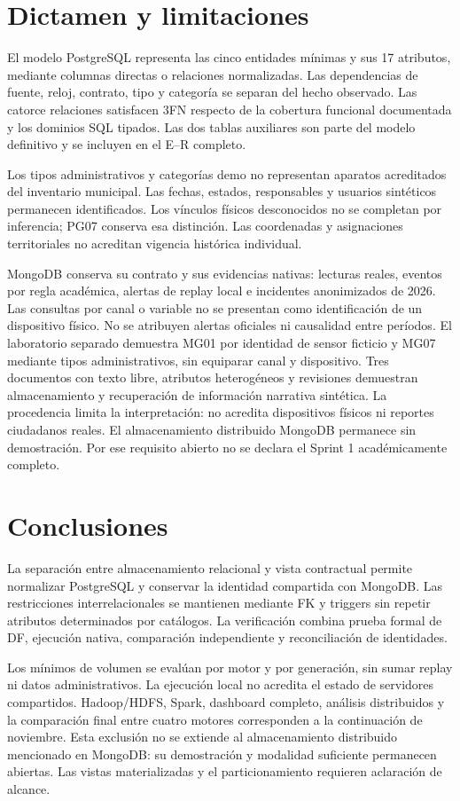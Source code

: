 \section{Dictamen y limitaciones}
El modelo PostgreSQL representa las cinco entidades mínimas y sus 17 atributos,
mediante columnas directas o relaciones normalizadas. Las dependencias de
fuente, reloj, contrato, tipo y categoría se separan del hecho observado.
Las catorce relaciones satisfacen 3FN respecto de la cobertura funcional
documentada y los dominios SQL tipados. Las dos tablas auxiliares son parte del
modelo definitivo y se incluyen en el E--R completo.

Los tipos administrativos y categorías demo no representan aparatos acreditados
del inventario municipal. Las fechas, estados, responsables y usuarios
sintéticos permanecen identificados. Los vínculos físicos desconocidos no se
completan por inferencia; PG07 conserva esa distinción. Las coordenadas y
asignaciones territoriales no acreditan vigencia histórica individual.

MongoDB conserva su contrato y sus evidencias nativas: lecturas reales, eventos
por regla académica, alertas de replay local e incidentes anonimizados de 2026.
Las consultas por canal o variable no se presentan como identificación de un
dispositivo físico. No se atribuyen alertas oficiales ni causalidad entre períodos.
El laboratorio separado demuestra MG01 por identidad de sensor ficticio y MG07
mediante tipos administrativos, sin equiparar canal y dispositivo. Tres documentos
con texto libre, atributos heterogéneos y revisiones demuestran almacenamiento y
recuperación de información narrativa sintética. La procedencia limita la
interpretación: no acredita dispositivos físicos ni reportes ciudadanos reales.
El almacenamiento distribuido MongoDB permanece sin demostración. Por ese
requisito abierto no se declara el Sprint 1 académicamente completo.

\section{Conclusiones}
La separación entre almacenamiento relacional y vista contractual permite
normalizar PostgreSQL y conservar la identidad compartida con MongoDB. Las
restricciones interrelacionales se mantienen mediante FK y triggers sin repetir
atributos determinados por catálogos. La verificación combina prueba formal de
DF, ejecución nativa, comparación independiente y reconciliación de identidades.

\begin{samepage}
Los mínimos de volumen se evalúan por motor y por generación, sin sumar replay
ni datos administrativos. La ejecución local no acredita el estado de servidores
compartidos. Hadoop/HDFS, Spark, dashboard completo, análisis distribuidos y la
comparación final entre cuatro motores corresponden a la continuación de
noviembre. Esta exclusión no se extiende al almacenamiento distribuido mencionado
en MongoDB: su demostración y modalidad suficiente permanecen abiertas. Las
vistas materializadas y el particionamiento requieren aclaración de alcance.

\end{samepage}

